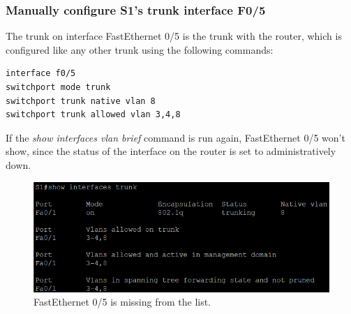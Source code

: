 \documentclass[a4paper]{article}
\newcommand{\ii}{\textit}
\begin{document}
\subsubsection{Manually configure S1’s trunk interface F0/5}
The trunk on interface FastEthernet 0/5 is the trunk with the router, which is configured like any other trunk using the following commands:
\begin{lstlisting}
interface f0/5
switchport mode trunk
switchport trunk native vlan 8
switchport trunk allowed vlan 3,4,8
\end{lstlisting}
If the \ii{show interfaces vlan brief} command is run again, FastEthernet 0/5 won't show, since the status of the interface on the router is set to administratively down.
\begin{figure}[!htbp]
	\includegraphics[scale=0.55]{images/s1_show_trunk.png}
	\centering
	\caption{FastEthernet 0/5 is missing from the list.}
\end{figure}
\end{document}
